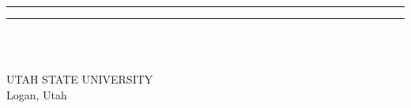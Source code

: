 {\begin{flushleft}
    \null{}\baselineskip
    \rule{2.5in}{1pt} \hspace{0.5in}  \rule{2.5in}{1pt}\\[-3pt]
    \makebox[2.5in][l]{\Zfirstreader} \hspace{0.5in}
    \makebox[2.5in][l]{\Zsecondreader}\\
     \hspace{0.5in}
  \end{flushleft}
    \null\vskip 2pt %
    \begin{center}
      UTAH STATE UNIVERSITY\\
      Logan, Utah\\
      {\Zyear}
   \end{center}
}
%
\def\makesignature{\newpage\null\vskip 54pt
  \begin{center} UTAH STATE UNIVERSITY \\[2\baselineskip] \end{center}
  \begin{flushright} {\Zdate} \end{flushright}
  \par\noindent We hereby recommend that the \Zdissertation\
  \uppercase\expandafter{\Ztitle}\ prepared under our supervision by
  \Zauthor\ be accepted as fulfilling in part requirements for the
  degree of \Zdegree
  \begin{center}
    \vskip 1\baselineskip
    \underline{Committee on Graduate Work} \\[1\baselineskip]
    \rule{3.5in}{1pt}\\[-8pt]
    \makebox[3.5in][l]{Commitee Member}
    \rule{3.5in}{1pt}\\[-8pt]
    \makebox[3.5in][l]{Commitee Member}
    \rule{3.5in}{1pt}\\[-8pt]
    \makebox[3.5in][l]{Commitee Member}
    \rule{3.5in}{1pt}\\[-8pt]
    \makebox[3.5in][l]{Adviser}
    \rule{3.5in}{1pt}\\[-8pt]
    \makebox[3.5in][l]{Department Head}
  \end{center}
}
%
